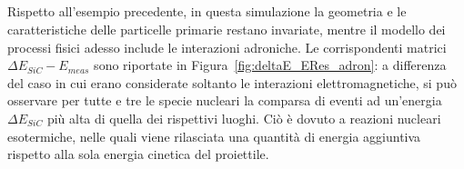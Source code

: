 




















\subsection{} \label{par:interazioni_adroniche}






Rispetto all'esempio precedente, in questa simulazione la geometria e le caratteristiche delle particelle primarie restano invariate, mentre il modello dei processi fisici adesso include le interazioni adroniche. 
Le corrispondenti matrici $\Delta E_{SiC} - E_{meas}$ sono riportate in Figura~\ref{fig:deltaE_ERes_adron}: a differenza del caso in cui erano considerate soltanto le interazioni elettromagnetiche, si può osservare per tutte e tre le specie nucleari la comparsa di eventi ad un'energia $\Delta E_{SiC}$ più alta di quella dei rispettivi luoghi.
Ciò è dovuto a reazioni nucleari esotermiche, nelle quali viene rilasciata una quantità di energia aggiuntiva rispetto alla sola energia cinetica del proiettile.

